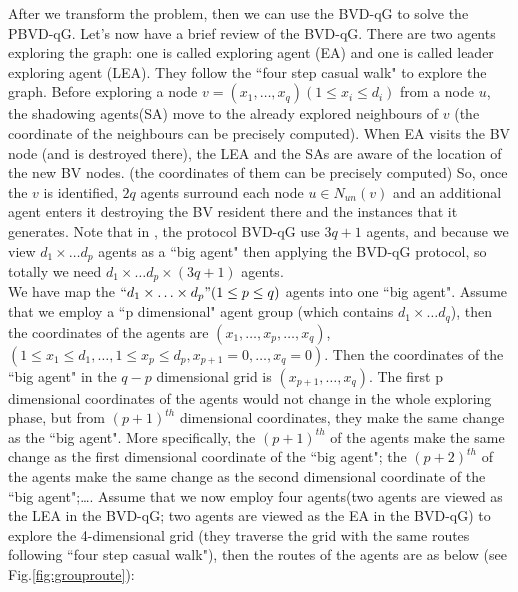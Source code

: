 After we transform the problem, then we can use the BVD-qG to solve the PBVD-qG. Let's now have a brief review of the BVD-qG. There are two agents exploring the graph: one is called exploring agent (EA) and one is called leader exploring agent (LEA). They follow the ``four step casual walk" to explore the graph. Before exploring a node $v=(x_1, \ldots, x_q) (1\leq x_i \leq d_i)$ from a node $u$, the shadowing agents(SA) move to the already explored neighbours of $v$ (the coordinate of the neighbours can be precisely computed). When EA visits the BV node (and is destroyed there), the LEA and the SAs are aware of the location of the new BV nodes. (the coordinates of them can be precisely computed) So, once the $v$ is identified, $2q$ agents surround each node $u\in N_{un}(v)$ and an additional agent enters it destroying the BV resident there and the instances that it generates. Note that in \cite{Cai}, the protocol BVD-qG use $3q+1$ agents, and because we view $d_1\times\ldots d_p$ agents as a ``big agent" then applying the BVD-qG protocol, so totally we need $d_1\times \ldots d_p\times (3q+1)$ agents.\\
We have map the $``d_1 \times \ldots \times d_p" (1\leq p\leq q)$ agents into one ``big agent". 
Assume that we employ a ``p dimensional" agent group (which contains $d_1 \times \ldots d_q$), then the coordinates of the agents are $(x_1, \ldots, x_p, \ldots, x_q)$, $(1\leq x_1\leq d_1, \ldots, 1\leq x_p\leq d_p, x_{p+1}=0, \ldots, x_q=0)$. Then the coordinates of the ``big agent" in the $q-p$ dimensional grid is $(x_{p+1},\ldots, x_q)$. The first p dimensional coordinates of the agents would not change in the whole exploring phase, but from $(p+1)^{th}$ dimensional coordinates, they make the same change as the ``big agent". More specifically, the $(p+1)^{th}$ of the agents make the same change as the first dimensional coordinate of the ``big agent"; the $(p+2)^{th}$ of the agents make the same change as the second dimensional coordinate of the ``big agent";\ldots. Assume that we now employ four agents(two agents are viewed as the LEA in the BVD-qG; two agents are viewed as the EA in the BVD-qG) to explore the 4-dimensional grid (they traverse the grid with the same routes following ``four step casual walk"), then the routes of the agents are as below (see Fig.\ref{fig:grouproute}):

